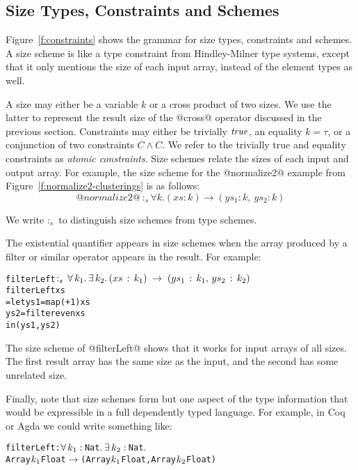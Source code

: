 \newcommand{\constr}[1]{\llbracket #1 \rrbracket}


\subsection{Size Types, Constraints and Schemes}
\label{s:SizeTypes}
Figure~\ref{f:constraints} shows the grammar for size types, constraints and schemes. A size scheme is like a type constraint from Hindley-Milner type systems, except that it only mentions the size of each input array, instead of the element types as well.

A size may either be a variable $k$ or a cross product of two sizes. We use the latter to represent the result size of the @cross@ operator discussed in the previous section. Constraints may either be trivially $\mathit{true}$, an equality $k = \tau$, or a conjunction of two constraints $C \wedge C$. We refer to the trivially true and equality constraints as \emph{atomic constraints}. Size schemes relate the sizes of each input and output array. For example, the size scheme for the @normalize2@ example from Figure~\ref{f:normalize2-clusterings} is as follows:
$$@normalize2@ ~:_s \forall k. (xs : k) \to (ys_1 : k,~ ys_2 : k)
$$

We write $:_s$ to distinguish size schemes from type schemes.

The existential quantifier appears in size schemes when the array produced by a filter or similar operator appears in the result. For example:
\begin{alltt}
 filterLeft \(:\sb{s}\,\forall\,k\sb{1}.\,\exists\,k\sb{2}.\,(xs\,:\,k\sb{1})\;\to\;(ys\sb{1}\,:\,k\sb{1},\,ys\sb{2}\,:\,k\sb{2})\)
 filterLeft xs
   = let ys1 = map (+ 1)   xs
         ys2 = filter even xs
     in (ys1, ys2)
\end{alltt}

The size scheme of @filterLeft@ shows that it works for input arrays of all sizes. The first result array has the same size as the input, and the second has some unrelated size.

Finally, note that size schemes form but one aspect of the type information that would be expressible in a full dependently typed language. For example, in Coq or Agda we could write something like:
\begin{alltt}
 filterLeft : \(\forall\,k\sb{1}:\,\)Nat\(.\,\exists\,k\sb{2}:\,\)Nat\(.\) 
   Array \(k\sb{1}\) Float \(\to\) (Array \(k\sb{1}\) Float, Array \(k\sb{2}\) Float)
\end{alltt}


